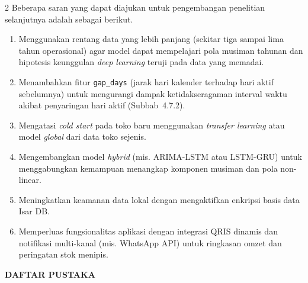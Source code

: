 \documentclass[12pt, a4paper, onecolumn, oneside]{report}
\begin{document}
\begin{spacing}{2}
Beberapa saran yang dapat diajukan untuk pengembangan penelitian selanjutnya adalah sebagai berikut.
\begin{enumerate}
    \item Menggunakan rentang data yang lebih panjang (sekitar tiga sampai lima tahun operasional) agar model dapat mempelajari pola musiman tahunan dan hipotesis keunggulan \textit{deep learning} teruji pada data yang memadai.
    \item Menambahkan fitur \texttt{gap\_days} (jarak hari kalender terhadap hari aktif sebelumnya) untuk mengurangi dampak ketidakseragaman interval waktu akibat penyaringan hari aktif (Subbab~4.7.2).
    \item Mengatasi \textit{cold start} pada toko baru menggunakan \textit{transfer learning} atau model \textit{global} dari data toko sejenis.
    \item Mengembangkan model \textit{hybrid} (mis. ARIMA-LSTM atau LSTM-GRU) untuk menggabungkan kemampuan menangkap komponen musiman dan pola non-linear.
    \item Meningkatkan keamanan data lokal dengan mengaktifkan enkripsi basis data Isar DB.
    \item Memperluas fungsionalitas aplikasi dengan integrasi QRIS dinamis dan notifikasi multi-kanal (mis. WhatsApp API) untuk ringkasan omzet dan peringatan stok menipis.
\end{enumerate}

\end{spacing}

\newpage
{}
{}
\begin{center}
{\large\bfseries DAFTAR PUSTAKA}
\end{center}
\end{document}
